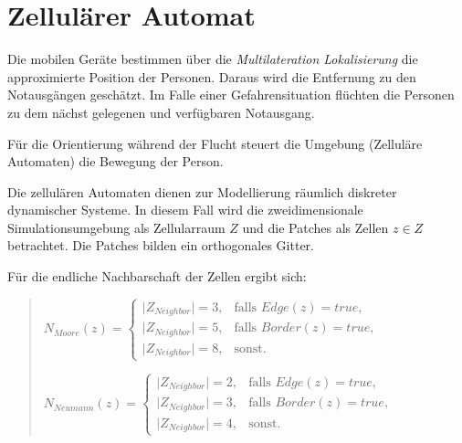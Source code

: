 \section{Zellul\"arer Automat}
\label{sec:cellular_automaton}


Die mobilen Geräte bestimmen über die \emph{Multilateration Lokalisierung} die approximierte Position der Personen. Daraus wird die Entfernung zu den Notausgängen geschätzt. Im Falle einer Gefahrensituation flüchten die Personen zu dem nächst gelegenen und verfügbaren Notausgang.

Für die Orientierung während der Flucht steuert die Umgebung (Zelluläre Automaten) die Bewegung der Person.

Die zellulären Automaten dienen zur Modellierung räumlich diskreter dynamischer Systeme. In diesem Fall wird die zweidimensionale Simulationsumgebung als Zellularraum $Z$ und die Patches als Zellen $z \in Z$ betrachtet. Die Patches bilden ein orthogonales Gitter.

Für die endliche Nachbarschaft der Zellen ergibt sich:

\begin{quote}
$ N_{Moore}(z)=\left\{\begin{array}{cl} \vert Z_{Neighbor}\vert = 3, & \mbox{falls }Edge(z) = true,\\ \vert Z_{Neighbor}\vert = 5, & \mbox{falls }Border(z) = true,\\ \vert Z_{Neighbor}\vert = 8, & \mbox{sonst.} \end{array}\right. $

$ N_{Neumann}(z)=\left\{\begin{array}{cl} \vert Z_{Neighbor}\vert = 2, & \mbox{falls }Edge(z) = true,\\ \vert Z_{Neighbor}\vert = 3, & \mbox{falls }Border(z) = true,\\ \vert Z_{Neighbor}\vert = 4, & \mbox{sonst.} \end{array}\right. $
\end{quote}

